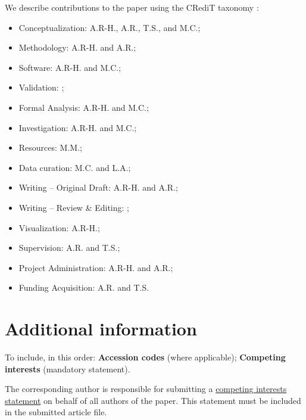 \documentclass[fleqn,10pt]{wlscirep}
\begin{document}
We describe contributions to the paper using the CRediT taxonomy \cite{brand2015-vd}:
\begin{itemize}
    \item Conceptualization: A.R-H., A.R., T.S., and M.C.;
    \item Methodology: A.R-H. and A.R.;
    \item Software: A.R-H. and M.C.;
    \item Validation: ;
    \item Formal Analysis: A.R-H. and M.C.;
    \item Investigation: A.R-H. and M.C.;
    \item Resources: M.M.;
    \item Data curation: M.C. and L.A.;
    \item Writing – Original Draft: A.R-H. and A.R.;
    \item Writing – Review \& Editing: ;
    \item Visualization: A.R-H.;
    \item Supervision: A.R. and T.S.;
    \item Project Administration: A.R-H. and A.R.;
    \item Funding Acquisition: A.R. and T.S.
\end{itemize}

\section*{Additional information}

To include, in this order: \textbf{Accession codes} (where applicable); \textbf{Competing interests} (mandatory statement). 

The corresponding author is responsible for submitting a \href{http://www.nature.com/srep/policies/index.html#competing}{competing interests statement} on behalf of all authors of the paper. This statement must be included in the submitted article file.



\end{document}
